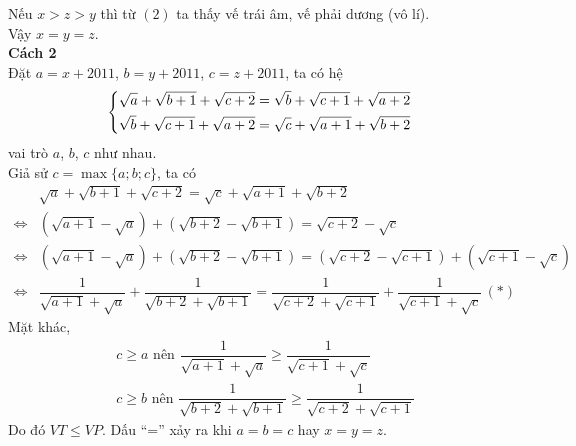 \begin{ex}
{  Nếu $x > z > y$ thì từ $(2)$ ta thấy vế trái âm, vế phải dương (vô lí).\\
  Vậy $x = y = z$.\\
  \textbf{Cách 2}\\
  Đặt $a = x + 2011$, $b = y + 2011$, $c = z + 2011$, ta có hệ
  $$\left\{\begin{aligned}& \sqrt{a} + \sqrt{b + 1} + \sqrt{c + 2} = \sqrt{b} + \sqrt{c + 1} + \sqrt{a + 2} \\& \sqrt{b} + \sqrt{c + 1} + \sqrt{a + 2} = \sqrt{c} + \sqrt{a + 1} + \sqrt{b + 2}\end{aligned}\right.$$ vai trò $a$, $b$, $c$ như nhau.\\
  Giả sử $c = \max \{ a; b; c\}$, ta có
  \begin{align*}
   & \sqrt{a} + \sqrt{b + 1} + \sqrt{c + 2} = \sqrt{c} + \sqrt{a + 1} + \sqrt{b + 2} \\
   \Leftrightarrow & \left( \sqrt{a + 1} - \sqrt{a} \right) + \left( \sqrt{b + 2} - \sqrt{b + 1} \right) = \sqrt{c + 2} - \sqrt{c} \\
   \Leftrightarrow & \left( \sqrt{a + 1} - \sqrt{a} \right) + \left( \sqrt{b + 2} - \sqrt{b + 1} \right) = \left( \sqrt{c + 2} - \sqrt{c + 1}\right) + \left( \sqrt{c + 1} - \sqrt{c}\right) \\
   \Leftrightarrow & \dfrac{1}{\sqrt{a + 1} + \sqrt{a}} + \dfrac{1}{\sqrt{b + 2} + \sqrt{b + 1}} = \dfrac{1}{\sqrt{c + 2} + \sqrt{c + 1}} + \dfrac{1}{\sqrt{c + 1} + \sqrt{c}} \, (*)
  \end{align*}
  Mặt khác,
  \begin{align*}
   & c \geq a \text{ nên } \dfrac{1}{\sqrt{a+ 1} + \sqrt{a}} \geq \dfrac{1}{\sqrt{c + 1} + \sqrt{c}} \\
   & c \geq b \text{ nên } \dfrac{1}{\sqrt{b + 2} + \sqrt{b + 1}} \geq \dfrac{1}{\sqrt{c + 2} + \sqrt{c + 1}}
  \end{align*}
  Do đó $VT \leq VP$. Dấu ``='' xảy ra khi $a = b = c$ hay $x = y = z$.
  }
\end{ex}

